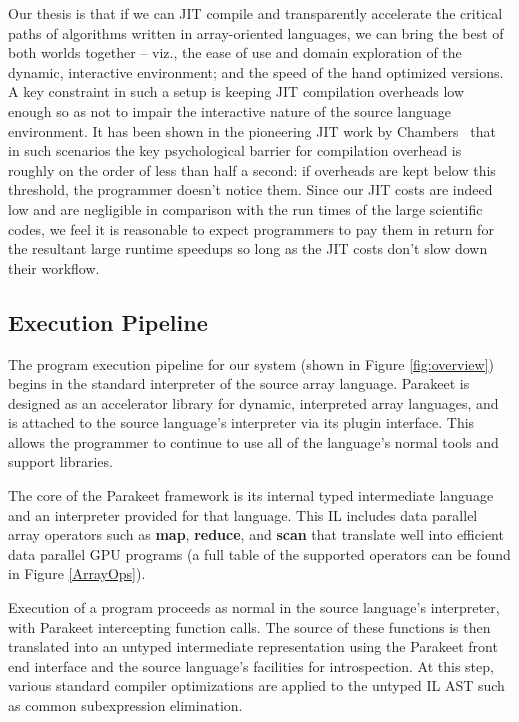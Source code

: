 \documentclass[preprint]{sigplanconf}
\begin{document}
Our thesis is that if we can JIT compile and transparently accelerate the critical paths of algorithms written in array-oriented languages, we can bring the best of both worlds together -- viz., the ease of use and domain exploration of the dynamic, interactive environment; and the speed of the hand optimized versions. A key constraint in such a setup is keeping JIT compilation overheads low enough so as not to impair the interactive nature of the source language environment.  It has been shown in the pioneering JIT work by Chambers~\cite{Cham92} that in such scenarios the key psychological barrier for compilation overhead is roughly on the order of less than half a second: if overheads are kept below this threshold, the programmer doesn't notice them.  Since our JIT costs are indeed low and are negligible in comparison with the run times of the large scientific codes, we feel it is reasonable to expect programmers to pay them in return for the resultant large runtime speedups so long as the JIT costs don't slow down their workflow.

\subsection{Execution Pipeline}
\label{executionpipeline}

The program execution pipeline for our system (shown in Figure \ref{fig:overview}) begins in the standard interpreter of the source array language.  Parakeet is designed as an accelerator library for dynamic, interpreted array languages, and is attached to the source language's interpreter via its plugin interface. This allows the programmer to continue to use all of the language's normal tools and support libraries.

The core of the Parakeet framework is its internal typed intermediate language and an interpreter provided for that language. This IL includes data parallel array operators such as \textbf{map}, \textbf{reduce}, and \textbf{scan} that translate well into efficient data parallel GPU programs (a full table of the supported operators can be found in Figure \ref{ArrayOps}).

Execution of a program proceeds as normal in the source language's interpreter, with Parakeet intercepting function calls.  The source of these functions is then translated into an untyped intermediate representation using the Parakeet front end interface and the source language's facilities for introspection. At this step, various standard compiler optimizations are applied to the untyped IL AST such as common subexpression elimination.
\end{document}
